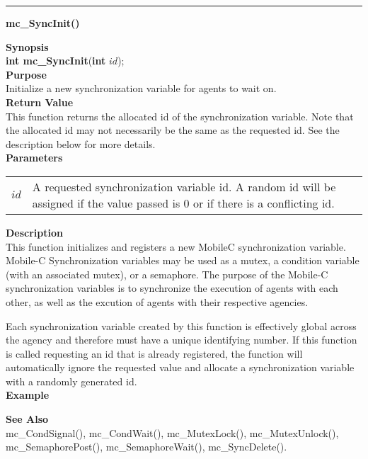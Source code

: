 \noindent
\vspace{5pt}
\rule{6.5in}{0.015in}
\noindent
{}
{\LARGE \bf mc\_SyncInit()}\\

\noindent
{\bf Synopsis}\\
{\bf int mc\_SyncInit}({\bf int} $id$);\\

\noindent
{\bf Purpose}\\
Initialize a new synchronization variable for agents to wait on.\\

\noindent
{\bf Return Value}\\
This function returns the allocated id of the synchronization variable. Note 
that the allocated id may not necessarily be the same as the requested
id. See the description below for more details.\\

\noindent
{\bf Parameters}
\vspace{-0.1in}
\begin{description}
\item
\begin{tabular}{p{10 mm}p{145 mm}}
$id$ & A requested synchronization variable id. A random id will be assigned 
if the value passed is 0 or if there is a conflicting id.
\end{tabular}
\end{description}

\noindent
{\bf Description}\\
This function initializes and registers a new MobileC synchronization variable.
Mobile-C Synchronization variables may be used as a mutex, a condition 
variable (with an associated mutex), or a semaphore. 
The purpose of the Mobile-C synchronization variables is to synchronize the 
execution of agents with each other, as well as the excution of agents with 
their respective agencies.

Each synchronization variable created by this function is effectively global
across the agency and therefore must have a unique identifying number. If
this function is called requesting an id that is already registered,
the function will automatically ignore the requested value and allocate
a synchronization variable with a randomly generated id.\\

\noindent
{\bf Example}\\
\noindent
{\footnotesize}

\noindent
{\bf See Also}\\
 mc\_CondSignal(), mc\_CondWait(), mc\_MutexLock(), mc\_MutexUnlock(), mc\_SemaphorePost(), mc\_SemaphoreWait(), mc\_SyncDelete().\\

